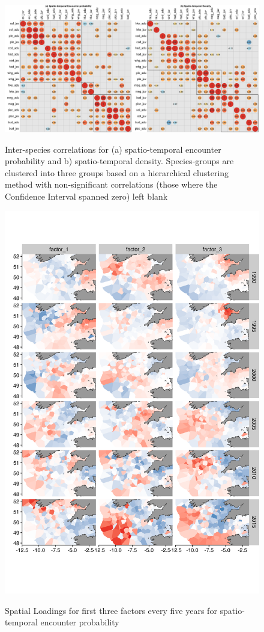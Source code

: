 \documentclass{article}
\begin{document}
\begin{figure}[!ht]
\begin{center}
	\includegraphics[width = \linewidth]{"figures/Suppl - Epsilon1Epsilon2_Correlations_blank"}
	\label{fig:S4}
	\caption{Inter-species correlations for (a) spatio-temporal encounter
		probability and b) spatio-temporal density.  Species-groups are
		clustered into three groups based on a hierarchical clustering
		method with non-significant correlations (those where the
		Confidence Interval spanned zero) left blank}
	\end{center}
\end{figure}

\begin{figure}
\begin{center}
	\includegraphics[width = 0.8\linewidth]{"figures/Suppl - SpatioTempLoadingsEpsilon1"}
	\label{fig:S5}
	\caption{Spatial Loadings for first three factors every five years for
	spatio-temporal encounter probability}
	\end{center}
\end{figure}
\end{document}
